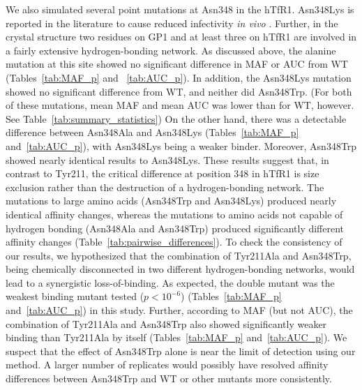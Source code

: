 \documentclass[12pt]{article}
\begin{document}
We also simulated several point mutations at Asn348 in the hTfR1. Asn348Lys is reported in the literature to cause reduced infectivity \textit{in vivo} \citep{Rad2008,Abraham2010}. Further, in the crystal structure two residues on GP1 and at least three on hTfR1 are involved in a fairly extensive hydrogen-bonding network. As discussed above, the alanine mutation at this site showed no significant difference in MAF or AUC from WT (Tables~\ref{tab:MAF_p} and ~\ref{tab:AUC_p}). In addition, the Asn348Lys mutation showed no significant difference from WT, and neither did Asn348Trp. (For both of these mutations, mean MAF and mean AUC was lower than for WT, however. See Table~\ref{tab:summary_statistics})  On the other hand, there was a detectable difference between Asn348Ala and Asn348Lys (Tables~\ref{tab:MAF_p} and~\ref{tab:AUC_p}), with Asn348Lys being a weaker binder. Moreover, Asn348Trp showed nearly identical results to Asn348Lys. These results suggest that, in contrast to Tyr211, the critical difference at position 348 in hTfR1 is size exclusion rather than the destruction of a hydrogen-bonding network. The mutations to large amino acids (Asn348Trp and Asn348Lys) produced nearly identical affinity changes, whereas the mutations to amino acids not capable of hydrogen bonding (Asn348Ala and Asn348Trp) produced significantly different affinity changes (Table~\ref{tab:pairwise_differences}). To check the consistency of our results, we hypothesized that the combination of Tyr211Ala and Asn348Trp, being chemically disconnected in two different hydrogen-bonding networks, would lead to a synergistic loss-of-binding. As expected, the double mutant was the weakest binding mutant tested ($ p < 10^{-6} $) (Tables~\ref{tab:MAF_p} and~\ref{tab:AUC_p}) in this study. Further, according to MAF (but not AUC), the combination of Tyr211Ala and Asn348Trp also showed significantly weaker binding than Tyr211Ala by itself (Tables~\ref{tab:MAF_p} and~\ref{tab:AUC_p}). We suspect that the effect of Asn348Trp alone is near the limit of detection using our method. A larger number of replicates would possibly have resolved affinity differences between Asn348Trp and WT or other mutants more consistently.
\end{document}
